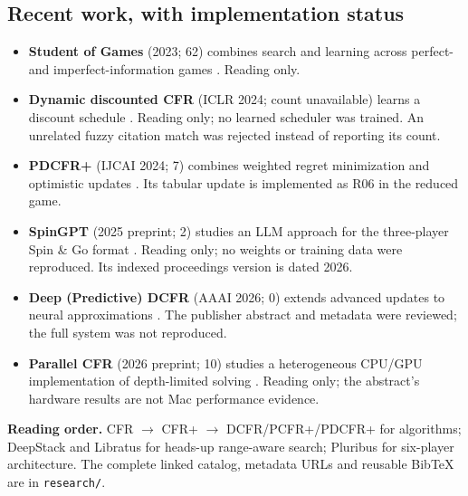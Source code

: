 \documentclass[10pt,letterpaper]{article}
\begin{document}
\subsection*{Recent work, with implementation status}
\begin{itemize}
\item \textbf{Student of Games} (2023; 62) combines search and learning across
perfect- and imperfect-information games \cite{student_games}. Reading only.
\item \textbf{Dynamic discounted CFR} (ICLR 2024; count unavailable) learns a
discount schedule \cite{ddcfr}. Reading only; no learned scheduler was trained.
An unrelated fuzzy citation match was rejected instead of reporting its count.
\item \textbf{PDCFR+} (IJCAI 2024; 7) combines weighted regret minimization
and optimistic updates \cite{pdcfr_plus}. Its tabular update is implemented as
R06 in the reduced game.
\item \textbf{SpinGPT} (2025 preprint; 2) studies an LLM approach for the
three-player Spin \& Go format \cite{spingpt}. Reading only; no weights or
training data were reproduced. Its indexed proceedings version is dated 2026.
\item \textbf{Deep (Predictive) DCFR} (AAAI 2026; 0) extends advanced updates
to neural approximations \cite{deep_pdcfr}. The publisher abstract and
metadata were reviewed; the full system was not reproduced.
\item \textbf{Parallel CFR} (2026 preprint; 10) studies a heterogeneous
CPU/GPU implementation of depth-limited solving \cite{parallel_cfr}.
Reading only; the abstract's hardware results are not Mac performance evidence.
\end{itemize}

\textbf{Reading order.} CFR $\rightarrow$ CFR+ $\rightarrow$ DCFR/PCFR+/PDCFR+
for algorithms; DeepStack and Libratus for heads-up range-aware search;
Pluribus for six-player architecture. The complete linked catalog, metadata
URLs and reusable BibTeX are in \texttt{research/}.

\newpage
\end{document}
